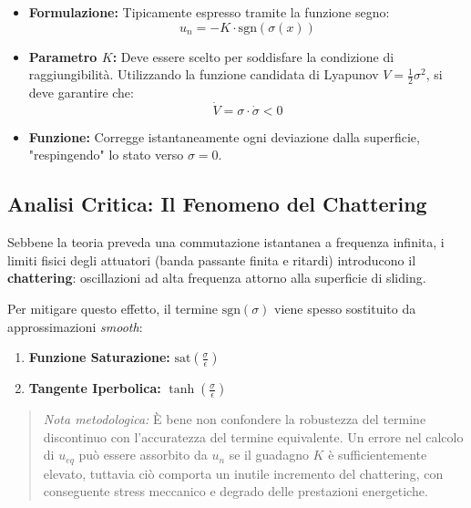 \documentclass[12pt,a4paper]{article}
\begin{document}
\begin{itemize}
    \item \textbf{Formulazione:} Tipicamente espresso tramite la funzione segno:
    \begin{equation}
        u_{n} = -K \cdot \text{sgn}(\sigma(x))
    \end{equation}
    \item \textbf{Parametro $K$:} Deve essere scelto per soddisfare la condizione di raggiungibilità. Utilizzando la funzione candidata di Lyapunov $V = \frac{1}{2}\sigma^2$, si deve garantire che:
    \begin{equation}
        \dot{V} = \sigma \cdot \dot{\sigma} < 0
    \end{equation}
    \item \textbf{Funzione:} Corregge istantaneamente ogni deviazione dalla superficie, "respingendo" lo stato verso $\sigma = 0$.
\end{itemize}

\subsection*{Analisi Critica: Il Fenomeno del Chattering}
Sebbene la teoria preveda una commutazione istantanea a frequenza infinita, i limiti fisici degli attuatori (banda passante finita e ritardi) introducono il \textbf{chattering}: oscillazioni ad alta frequenza attorno alla superficie di sliding.

Per mitigare questo effetto, il termine $\text{sgn}(\sigma)$ viene spesso sostituito da approssimazioni \textit{smooth}:
\begin{enumerate}
    \item \textbf{Funzione Saturazione:} $\text{sat}\left(\frac{\sigma}{\epsilon}\right)$
    \item \textbf{Tangente Iperbolica:} $\tanh\left(\frac{\sigma}{\epsilon}\right)$
\end{enumerate}

\begin{quote}
    \textit{Nota metodologica:} È bene non confondere la robustezza del termine discontinuo con l'accuratezza del termine equivalente. Un errore nel calcolo di $u_{eq}$ può essere assorbito da $u_{n}$ se il guadagno $K$ è sufficientemente elevato, tuttavia ciò comporta un inutile incremento del chattering, con conseguente stress meccanico e degrado delle prestazioni energetiche.
\end{quote}
\end{document}
